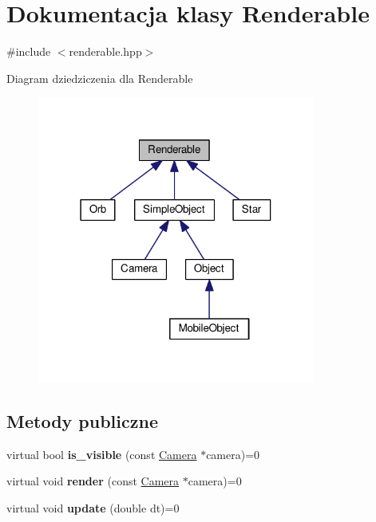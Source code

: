 \hypertarget{class_renderable}{}\section{Dokumentacja klasy Renderable}
\label{class_renderable}


{\ttfamily \#include $<$renderable.\+hpp$>$}



Diagram dziedziczenia dla Renderable
\nopagebreak
\begin{figure}[H]
\begin{center}
\leavevmode
\includegraphics[width=259pt]{class_renderable__inherit__graph}
\end{center}
\end{figure}
\subsection*{Metody publiczne}
\begin{DoxyCompactItemize}
\item 
virtual bool {\bfseries is\+\_\+visible} (const \hyperlink{class_camera}{Camera} $\ast$camera)=0\hypertarget{class_renderable_a6a408454645cebdfde19ea048c488eb4}{}\label{class_renderable_a6a408454645cebdfde19ea048c488eb4}

\item 
virtual void {\bfseries render} (const \hyperlink{class_camera}{Camera} $\ast$camera)=0\hypertarget{class_renderable_ab96dd5662a667a725e7fbfeb261c9134}{}\label{class_renderable_ab96dd5662a667a725e7fbfeb261c9134}

\item 
virtual void {\bfseries update} (double dt)=0\hypertarget{class_renderable_af0588aa758ec2bf2dd476ca143167b0c}{}\label{class_renderable_af0588aa758ec2bf2dd476ca143167b0c}

\end{DoxyCompactItemize}


